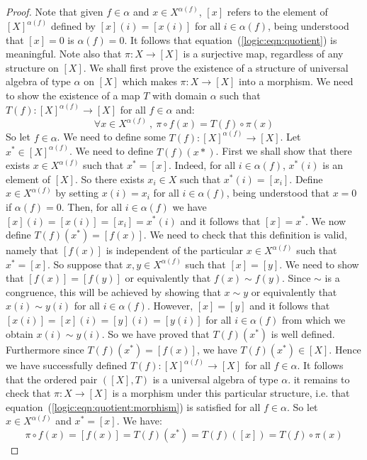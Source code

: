 \begin{proof}
Note that given $f\in\alpha$ and $x\in X^{\alpha(f)}$, $[x]$ refers
to the element of $[X]^{\alpha(f)}$ defined by $[x](i)=[x(i)]$ for
all $i\in\alpha(f)$, being understood that $[x]=0$ is $\alpha(f)=0$.
It follows that equation~(\ref{logic:eqn:quotient}) is meaningful.
Note also that $\pi:X\to [X]$ is a surjective map, regardless of any
structure on $[X]$. We shall first prove the existence of a
structure of universal algebra of type $\alpha$ on $[X]$ which makes
$\pi:X\to[X]$ into a morphism. We need to show the existence of a
map $T$ with domain $\alpha$ such that $T(f):[X]^{\alpha(f)}\to[X]$
for all $f\in\alpha$ and:
    \begin{equation}\label{logic:eqn:quotient:morphism}
    \forall x\in X^{\alpha(f)}\ ,\ \pi\circ f(x) = T(f)\circ\pi(x)
    \end{equation}
So let $f\in\alpha$. We need to define some
$T(f):[X]^{\alpha(f)}\to[X]$. Let $x^{*}\in[X]^{\alpha(f)}$. We need
to define $T(f)(x*)$. First we shall show that there exists $x\in
X^{\alpha(f)}$ such that $x^{*}=[x]$. Indeed, for all
$i\in\alpha(f)$, $x^{*}(i)$ is an element of $[X]$. So there exists
$x_{i}\in X$ such that $x^{*}(i)=[x_{i}]$. Define $x\in
X^{\alpha(f)}$ by setting $x(i)=x_{i}$ for all $i\in\alpha(f)$,
being understood that $x=0$ if $\alpha(f)=0$. Then, for all
$i\in\alpha(f)$ we have $[x](i)=[x(i)]=[x_{i}]=x^{*}(i)$ and it
follows that $[x]=x^{*}$. We now define $T(f)(x^{*})=[f(x)]$. We
need to check that this definition is valid, namely that $[f(x)]$ is
independent of the particular $x\in X^{\alpha(f)}$ such that
$x^{*}=[x]$. So suppose that $x,y\in X^{\alpha(f)}$ such that
$[x]=[y]$. We need to show that $[f(x)]=[f(y)]$ or equivalently that
$f(x)\sim f(y)$. Since $\sim$ is a congruence, this will be achieved
by showing that $x\sim y$ or equivalently that $x(i)\sim y(i)$ for
all $i\in\alpha(f)$. However, $[x]=[y]$ and it follows that
$[x(i)]=[x](i)=[y](i)=[y(i)]$ for all $i\in\alpha(f)$ from which we
obtain $x(i)\sim y(i)$. So we have proved that $T(f)(x^{*})$ is well
defined. Furthermore since $T(f)(x^{*})=[f(x)]$, we have
$T(f)(x^{*})\in [X]$. Hence we have successfully defined
$T(f):[X]^{\alpha(f)}\to[X]$ for all $f\in\alpha$. It follows that
the ordered pair $([X],T)$ is a universal algebra of type $\alpha$.
it remains to check that $\pi:X\to[X]$ is a morphism under this
particular structure, i.e. that
equation~(\ref{logic:eqn:quotient:morphism}) is satisfied for all
$f\in\alpha$. So let $x\in X^{\alpha(f)}$ and $x^{*}=[x]$. We have:
    \[
    \pi\circ f(x)=[f(x)]=T(f)(x^{*})=T(f)([x])=T(f)\circ\pi(x)
\]
\end{proof}
